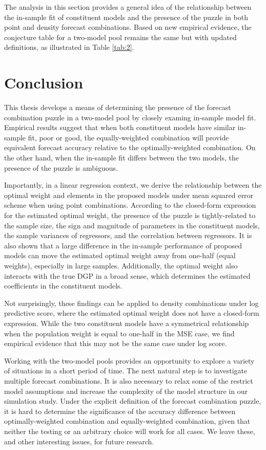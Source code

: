 \documentclass{monashthesis}
\begin{document}
The analysis in this section provides a general idea of the relationship between the in-sample fit of constituent models and the presence of the puzzle in both point and density forecast combinations. Based on new empirical evidence, the conjecture table for a two-model pool remains the same but with updated definitions, as illustrated in Table \ref{tab:2}.

\hypertarget{conclusion}{%
\chapter{Conclusion}\label{conclusion}}

This thesis develops a means of determining the presence of the forecast combination puzzle in a two-model pool by closely examing in-sample model fit. Empirical results suggest that when both constituent models have similar in-sample fit, poor or good, the equally-weighted combination will provide equivalent forecast accuracy relative to the optimally-weighted combination. On the other hand, when the in-sample fit differs between the two models, the presence of the puzzle is ambiguous.

Importantly, in a linear regression context, we derive the relationship between the optimal weight and elements in the proposed models under mean squared error scheme when using point combinations. According to the closed-form expression for the estimated optimal weight, the presence of the puzzle is tightly-related to the sample size, the sign and magnitude of parameters in the constituent models, the sample variances of regressors, and the correlation between regressors. It is also shown that a large difference in the in-sample performance of proposed models can move the estimated optimal weight away from one-half (equal weights), especially in large samples. Additionally, the optimal weight also interacts with the true DGP in a broad sense, which determines the estimated coefficients in the constituent models.

Not surprisingly, these findings can be applied to density combinations under log predictive score, where the estimated optimal weight does not have a closed-form expression. While the two constituent models have a symmetrical relationship when the population weight is equal to one-half in the MSE case, we find empirical evidence that this may not be the same case under log score.

Working with the two-model pools provides an opportunity to explore a variety of situations in a short period of time. The next natural step is to investigate multiple forecast combinations. It is also necessary to relax some of the restrict model assumptions and increase the complexity of the model structure in our simulation study. Under the explicit definition of the forecast combination puzzle, it is hard to determine the significance of the accuracy difference between optimally-weighted combination and equally-weighted combination, given that neither the testing or an arbitrary choice will work for all cases. We leave these, and other interesting issues, for future research.
\end{document}
